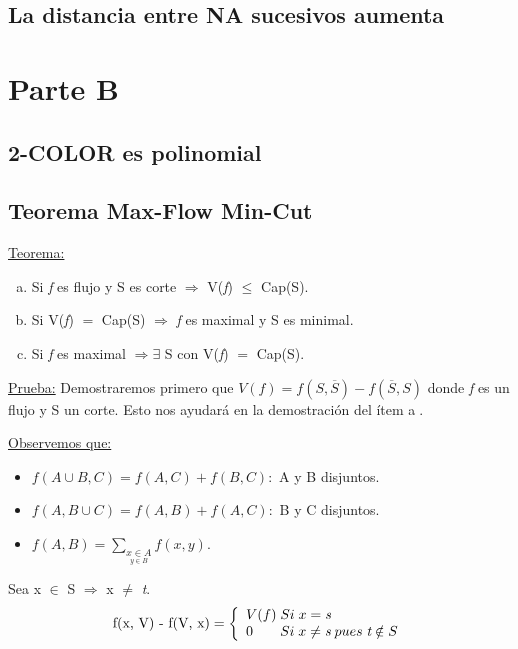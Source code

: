 \documentclass[12pt,a4paper]{report}
\newcounter{neq}
\begin{document}
	
	\section{La distancia entre NA sucesivos aumenta}
	


\chapter{Parte B}

	\section{2-COLOR es polinomial}
	
	
	\section{Teorema Max-Flow Min-Cut}
		\underline{Teorema:}
		\begin{enumerate}[a)]
			\item Si \textit{f} es flujo y S es corte $\Rightarrow$ V(\textit{f}) $\leq$ Cap(S).
			\item Si V(\textit{f}) $=$ Cap(S) $\Rightarrow$ \textit{f} es maximal y S es minimal.
			\item Si \textit{f} es maximal $\Rightarrow \exists$ S con V(\textit{f}) $=$ Cap(S).
		\end{enumerate}
		
		\underline{Prueba:} Demostraremos primero que $V(\textit{f}) = f(S, \overline{S}) - f(\overline{S},S)$ donde \textit{f} es un flujo y S un corte. Esto nos ayudará en la demostración del ítem \textcircled{a}.
		
		\underline{Observemos que:}
		\begin{itemize}
			\item $f(A \cup B, C) = f(A,C) + f(B,C):$ A y B disjuntos.
			\item $f(A, B \cup C) = f(A,B) + f(A,C):$ B y C disjuntos.
			\item $f(A,B) = \underset {\underset {y \in B} {x \in A}} \sum f(x,y).$
		\end{itemize}
		
		Sea x $\in$ S $\Rightarrow$ x $\neq$ \textit{t}.
		\begin{equation*}
			\textup{f(x, V) - f(V, x)} =
  			\left\lbrace
  			\begin{array}{l}
    		 V(f) \; Si \; x= \textit{s} \\
     		 0 \; \; \; \; \; \; \;  Si \; x \neq \textit{s} \; pues \; \textit{t} \notin S \\
  			\end{array}
 			 \right.
		\end{equation*}
		
\end{document}
